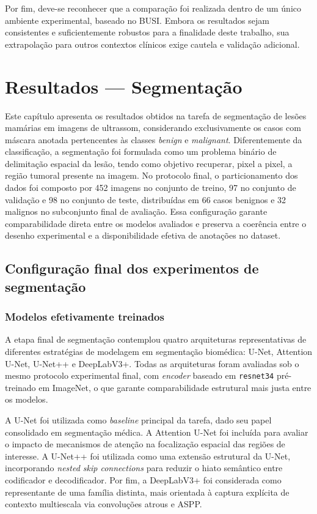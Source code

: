 \documentclass[tcc,capa]{texufpel}
\begin{document}
Por fim, deve-se reconhecer que a comparação foi realizada dentro de um único ambiente experimental, baseado no BUSI. Embora os resultados sejam consistentes e suficientemente robustos para a finalidade deste trabalho, sua extrapolação para outros contextos clínicos exige cautela e validação adicional.

\chapter{Resultados --- Segmentação}

Este capítulo apresenta os resultados obtidos na tarefa de segmentação de lesões mamárias em imagens de ultrassom, considerando exclusivamente os casos com máscara anotada pertencentes às classes \textit{benign} e \textit{malignant}. Diferentemente da classificação, a segmentação foi formulada como um problema binário de delimitação espacial da lesão, tendo como objetivo recuperar, pixel a pixel, a região tumoral presente na imagem. No protocolo final, o particionamento dos dados foi composto por 452 imagens no conjunto de treino, 97 no conjunto de validação e 98 no conjunto de teste, distribuídas em 66 casos benignos e 32 malignos no subconjunto final de avaliação. Essa configuração garante comparabilidade direta entre os modelos avaliados e preserva a coerência entre o desenho experimental e a disponibilidade efetiva de anotações no dataset.

\section{Configuração final dos experimentos de segmentação}

\subsection{Modelos efetivamente treinados}

A etapa final de segmentação contemplou quatro arquiteturas representativas de diferentes estratégias de modelagem em segmentação biomédica: U-Net, Attention U-Net, U-Net++ e DeepLabV3+. Todas as arquiteturas foram avaliadas sob o mesmo protocolo experimental final, com \textit{encoder} baseado em \texttt{resnet34} pré-treinado em ImageNet, o que garante comparabilidade estrutural mais justa entre os modelos.

A U-Net foi utilizada como \textit{baseline} principal da tarefa, dado seu papel consolidado em segmentação médica. A Attention U-Net foi incluída para avaliar o impacto de mecanismos de atenção na focalização espacial das regiões de interesse. A U-Net++ foi utilizada como uma extensão estrutural da U-Net, incorporando \textit{nested skip connections} para reduzir o hiato semântico entre codificador e decodificador. Por fim, a DeepLabV3+ foi considerada como representante de uma família distinta, mais orientada à captura explícita de contexto multiescala via convoluções atrous e ASPP.
\end{document}
